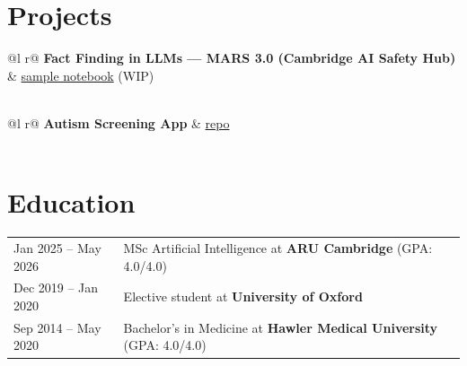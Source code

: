 \documentclass[a4paper,12pt]{article}
\begin{document}
\section{Projects}

\begin{tabularx}{\linewidth}{ @{}l r@{} }
\textbf{Fact Finding in LLMs — MARS 3.0 (Cambridge AI Safety Hub)} & \hfill \href{https://stefanhex.com/mars-transformer-knowledge/ablations_main.html}{sample notebook} (WIP) \\[3.75pt]
  \\
\end{tabularx}

\vspace{6pt}

\begin{tabularx}{\linewidth}{ @{}l r@{} }
\textbf{Autism Screening App} & \hfill \href{https://github.com/mshahoyi/asd_screener}{repo} \\[3.75pt]
  \\
\end{tabularx}


  
\section{Education}
\begin{tabularx}{\linewidth}{@{}l X@{}} 

Jan 2025 -- May 2026 & MSc Artificial Intelligence at \textbf{ARU Cambridge} \hfill (GPA: 4.0/4.0) \\

Dec 2019 -- Jan 2020 & Elective student at \textbf{University of Oxford} \\

Sep 2014 -- May 2020 & Bachelor's in Medicine at \textbf{Hawler Medical University} \hfill (GPA: 4.0/4.0) \\

\end{tabularx}
\end{document}
